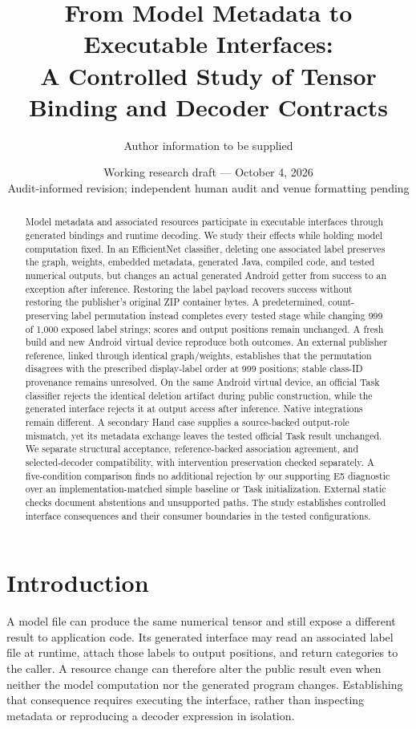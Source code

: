 \documentclass[10pt,twocolumn,letterpaper]{article}
\title{From Model Metadata to Executable Interfaces:\\A Controlled Study of Tensor Binding and Decoder Contracts}
\author{Author information to be supplied}
\date{Working research draft --- October 4, 2026\\\small Audit-informed revision; independent human audit and venue formatting pending}
\begin{document}
\maketitle

\begin{abstract}
Model metadata and associated resources participate in executable interfaces through generated bindings and runtime decoding. We study their effects while holding model computation fixed. In an EfficientNet classifier, deleting one associated label preserves the graph, weights, embedded metadata, generated Java, compiled code, and tested numerical outputs, but changes an actual generated Android getter from success to an exception after inference. Restoring the label payload recovers success without restoring the publisher's original ZIP container bytes. A predetermined, count-preserving label permutation instead completes every tested stage while changing 999 of 1,000 exposed label strings; scores and output positions remain unchanged. A fresh build and new Android virtual device reproduce both outcomes. An external publisher reference, linked through identical graph/weights, establishes that the permutation disagrees with the prescribed display-label order at 999 positions; stable class-ID provenance remains unresolved. On the same Android virtual device, an official Task classifier rejects the identical deletion artifact during public construction, while the generated interface rejects it at output access after inference. Native integrations remain different. A secondary Hand case supplies a source-backed output-role mismatch, yet its metadata exchange leaves the tested official Task result unchanged. We separate structural acceptance, reference-backed association agreement, and selected-decoder compatibility, with intervention preservation checked separately. A five-condition comparison finds no additional rejection by our supporting E5 diagnostic over an implementation-matched simple baseline or Task initialization. External static checks document abstentions and unsupported paths. The study establishes controlled interface consequences and their consumer boundaries in the tested configurations.
\end{abstract}

\section{Introduction}
A model file can produce the same numerical tensor and still expose a different result to application code. Its generated interface may read an associated label file at runtime, attach those labels to output positions, and return categories to the caller. A resource change can therefore alter the public result even when neither the model computation nor the generated program changes. Establishing that consequence requires executing the interface, rather than inspecting metadata or reproducing a decoder expression in isolation.
\end{document}
